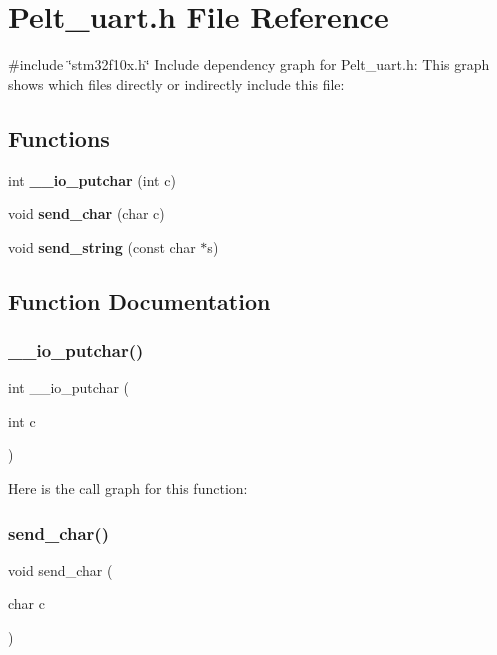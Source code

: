 \section{Pelt\+\_\+uart.\+h File Reference}
\label{_pelt__uart_8h}
{\ttfamily \#include \char`\"{}stm32f10x.\+h\char`\"{}}\newline
Include dependency graph for Pelt\+\_\+uart.\+h\+:
This graph shows which files directly or indirectly include this file\+:
\subsection*{Functions}
\begin{DoxyCompactItemize}
\item 
int \textbf{ \+\_\+\+\_\+io\+\_\+putchar} (int c)
\item 
void \textbf{ send\+\_\+char} (char c)
\item 
void \textbf{ send\+\_\+string} (const char $\ast$s)
\end{DoxyCompactItemize}


\subsection{Function Documentation}
\mbox{\label{_pelt__uart_8h_aa0a607477e5bbc033c448373b90387b8}} 
\subsubsection{\+\_\+\+\_\+io\+\_\+putchar()}
{\footnotesize\ttfamily int \+\_\+\+\_\+io\+\_\+putchar (\begin{DoxyParamCaption}\item[{int}]{c }\end{DoxyParamCaption})}

Here is the call graph for this function\+:
\mbox{\label{_pelt__uart_8h_a4bf168796f84a0a0b725fdeb06f15c73}} 
\subsubsection{send\+\_\+char()}
{\footnotesize\ttfamily void send\+\_\+char (\begin{DoxyParamCaption}\item[{char}]{c }\end{DoxyParamCaption})}

